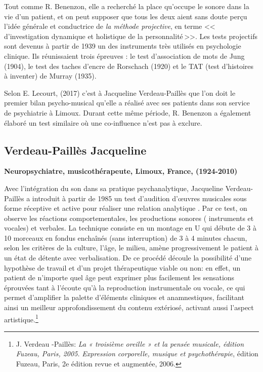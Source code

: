    Tout comme R. Benenzon, elle a recherché  la place qu'occupe le sonore dans la vie d'un 
        patient, et on peut supposer que tous les deux aient sans doute perçu l'idée générale et 
        conductrice de \emph{la méthode projective}, 
        en terme 
	    <<\,d'investigation dynamique et holistique de la
            personnalité\,>>.
            Les tests projectifs sont devenus à partir
        de 1939 un des instruments très utilisés en psychologie
        clinique. Ils réunissaient trois épreuves : le test
        d'association de mots de Jung (1904), le test des taches
        d'encre de Rorschach (1920) et le TAT (test d'histoires à
        inventer) de Murray (1935)\autocite[ch.~1, p.~13] {anzieu.chabert:methodes}.

        Selon E. Lecourt,
(2017)\autocite[ch.~3, p.~84]{lecourt_les_2017}
c'est à Jacqueline Verdeau-Paillès que l'on doit le premier bilan
psycho-musical qu'elle a réalisé avec ses patients dans son service
de psychiatrie à Limoux. Durant cette même période, R.
Benenzon a également élaboré un test similaire
\autocite{benenzon:musicotherapie} où une co-influence n'est pas à exclure.


	


\subsection{Verdeau-Paillès Jacqueline
}
\textbf{Neuropsychiatre,
  musicothérapeute, Limoux, France, (1924-2010)}

Avec l'intégration du son dans sa pratique psychanalytique, 
Jacqueline Verdeau-Paillès a introduit  à partir de 1985  un test d'audition d'\oe uvres musicales
sous forme réceptive et active pour réaliser
une relation analytique \autocite{verdeau-pailles:bilan}.
Par ce test, on
observe les réactions comportementales, les productions sonores (
instruments et vocales) et verbales. La technique consiste en un montage en U qui débute de 3 à 10
morceaux en fondus enchaînés (sans interruption) de 3 à 4 minutes chacun, selon les
critères de la culture, l'âge, le milieu,
amène progressivement le patient à un état de détente
avec verbalisation. De ce procédé découle la possibilité 
d'une hypothèse de
travail et d'un projet thérapeutique viable ou non:
en effet, un patient de n'importe quel âge peut exprimer plus facilement les
sensations éprouvées tant à l'écoute qu'à la reproduction
instrumentale ou vocale, ce qui permet d'amplifier la palette d'éléments
cliniques et anamnestiques, facilitant ainsi un meilleur approfondissement du
contenu extériosé, activant aussi l'aspect artistique.\footnote{
  J. Verdeau -Paillès:\textit{ La « troisième oreille » et la pensée musicale, édition Fuzeau, Paris, 2005.}
\textit{Expression corporelle, musique et psychothérapie}, édition Fuzeau,
Paris, 2e édition revue et augmentée, 2006.} 



